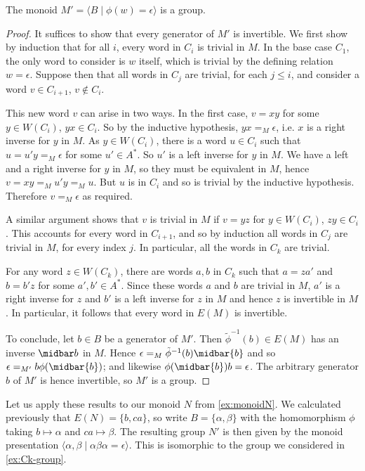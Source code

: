 \documentclass[noindex,noinsetproof,12pt]{lmaths}
\begin{document}
\begin{prop} \label{prop:M'-is-group}
	The monoid $M' = \langle B \mid \phi(w) = \epsilon\rangle$ is a group.
\end{prop}
\begin{proof}
	It suffices to show that every generator of $M'$ is invertible. We first show by induction that for all $i$, every word in $C_i$ is trivial in $M$. In the base case $C_1$, the only word to consider is $w$ itself, which is trivial by the defining relation $w = \epsilon$. Suppose then that all words in $C_j$ are trivial, for each $j \le i$, and consider a word $v \in C_{i+1}$, $v \not\in C_i$.

	This new word $v$ can arise in two ways. In the first case, $v = xy$ for some $y \in W(C_i)$, $yx \in C_i$. So by the inductive hypothesis, $yx =_M \epsilon$, i.e. $x$ is a right inverse for $y$ in $M$. As $y \in W(C_i)$, there is a word $u \in C_i$ such that $u = u'y =_M \epsilon$ for some $u' \in A^*$. So $u'$ is a left inverse for $y$ in $M$. We have a left and a right inverse for $y$ in $M$, so they must be equivalent in $M$, hence $v = xy =_M u'y =_M u$. But $u$ is in $C_i$ and so is trivial by the inductive hypothesis. Therefore $v =_M \epsilon$ as required.

	A similar argument shows that $v$ is trivial in $M$ if $v = yz$ for $y \in W(C_i)$, $zy \in C_i$. This accounts for every word in $C_{i+1}$, and so by induction all words in $C_j$ are trivial in $M$, for every index $j$. In particular, all the words in $C_k$ are trivial.

	For any word $z \in W(C_k)$, there are words $a, b$ in $C_k$ such that $a = za'$ and $b = b'z$ for some $a', b' \in A^*$. Since these words $a$ and $b$ are trivial in $M$, $a'$ is a right inverse for $z$ and $b'$ is a left inverse for $z$ in $M$ and hence $z$ is invertible in $M$. In particular, it follows that every word in $E(M)$ is invertible.

	To conclude, let $b \in B$ be a generator of $M'$. Then $\tilde\phi^{-1}(b) \in E(M)$ has an inverse $\midbar b$ in $M$. Hence $\epsilon =_M \tilde\phi^{-1}(b) \midbar{b}$ and so $\epsilon =_{M'} b\phi(\midbar{b})$; and likewise $\phi(\midbar{b})b = \epsilon$. The arbitrary generator $b$ of $M'$ is hence invertible, so $M'$ is a group.
\end{proof}

Let us apply these results to our monoid $N$ from \cref{ex:monoidN}. We calculated previously that $E(N) = \{b, ca\}$, so write $B = \{\alpha, \beta\}$ with the homomorphism $\phi$ taking $b \mapsto \alpha$ and $ca \mapsto \beta$. The resulting group $N'$ is then given by the monoid presentation $\langle \alpha, \beta \mid \alpha\beta\alpha = \epsilon \rangle$. This is isomorphic to the group we considered in \cref{ex:Ck-group}.
\end{document}
